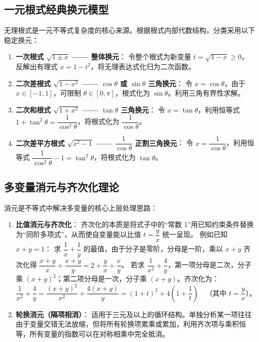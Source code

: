 \documentclass[12pt,a4paper]{ctexart}
\begin{document}
\subsection{一元根式经典换元模型}
无理根式是一元不等式复杂度的核心来源。根据根式内部代数结构，分类采用以下稳定换元：

\begin{enumerate}[label=\arabic*. , leftmargin=2em, itemsep=1.2em, topsep=0.2em]
  \item \textbf{一次根式 \(\sqrt{1 \pm x}\) —— 整体换元}：
  令整个根式为新变量 \(t = \sqrt{1-x} \geqslant 0\)，反解出有理式 \(x = 1-t^2\)，将无理表达式化归为二次函数。
  
  \item \textbf{二次差根式 \(\sqrt{1-x^2}\) —— \(\cos\theta\) 或 \(\sin\theta\) 三角换元}：
  令 \(x = \cos\theta\)，由于 \(x \in [-1, 1]\)，可限制 \(\theta \in [0, \pi]\)，根式化为 \(\sin\theta\)。利用三角有界性求解。
  
  \item \textbf{二次和根式 \(\sqrt{1+x^2}\) —— \(\tan\theta\) 三角换元}：
  令 \(x = \tan\theta\)，利用恒等式 \(1+\tan^2\theta = \dfrac{1}{\cos^2\theta}\)，将根式化为 \(\dfrac{1}{\cos\theta}\)。
  
  \item \textbf{二次差平方根式 \(\sqrt{x^2-1}\) —— \(\dfrac{1}{\cos\theta}\) 正割三角换元}：
  令 \(x = \dfrac{1}{\cos\theta}\)，利用恒等式 \(\dfrac{1}{\cos^2\theta} - 1 = \tan^2\theta\)，将根式化为 \(\tan\theta\)。
\end{enumerate}

\subsection{多变量消元与齐次化理论}
消元是不等式中解决多变量的核心上层处理思路：

\begin{enumerate}[label=\arabic*. , leftmargin=2em, itemsep=1.2em, topsep=0.2em]
  \item \textbf{比值消元与齐次化}：
  齐次化的本质是将式子中的“常数 1”用已知约束条件替换为“同阶多项式”，从而使自变量能以比值 \(t = \dfrac{y}{x}\) 统一呈现。
  例如已知 \(x+y=1\)：
  求 \(\dfrac{1}{x} + \dfrac{1}{y}\) 的最值，由于分子是零阶，分母是一阶，乘以 \(x+y\) 齐次化得 \(\dfrac{x+y}{x} + \dfrac{x+y}{y} = 2 + \dfrac{y}{x} + \dfrac{x}{y}\)。
  若求 \(\dfrac{1}{x^2} + \dfrac{4}{y}\)，第一项分母是二次，分子乘 \((x+y)^2\)；第二项分母是一次，分子乘 \((x+y)\)。齐次化为：
  \[
  \frac{1}{x^2} + \frac{4}{y} = \frac{(x+y)^2}{x^2} + \frac{4(x+y)}{y} = (1+t)^2 + 4\left(1+\frac{1}{t}\right) \quad \text{（其中 } t = \frac{y}{x}\text{）。}
  \]
  
  \item \textbf{轮换消元（隔项相消）}：
  适用于三元及以上的循环结构。单独分析某一项往往由于变量交错无法放缩，但将所有轮换项累乘或累加，利用齐次项与乘积恒等，所有变量的指数可以在对称相乘中完全抵消。
\end{enumerate}
\end{document}
